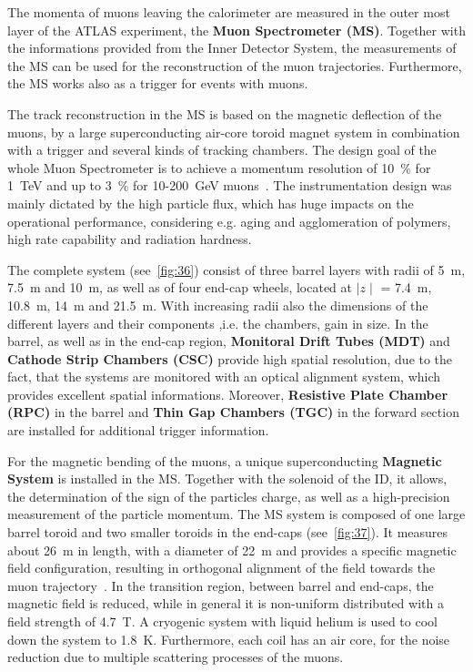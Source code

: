  The momenta of muons leaving the calorimeter are measured in the outer most layer of the ATLAS experiment, the \textbf{Muon Spectrometer (MS)}. Together with the informations provided from the Inner Detector System, the measurements of the MS can be used for the reconstruction of the muon trajectories. Furthermore, the MS works also as a trigger for events with muons.

The track reconstruction in the MS is based on the magnetic deflection of the muons, by a large superconducting air-core toroid magnet system in combination with a trigger and several kinds of tracking chambers. The design goal of the whole Muon Spectrometer is to achieve a momentum resolution of 10~\% for 1~TeV and up to 3~\% for 10-200~GeV muons~\cite{ATLAS:1999uwa}. The instrumentation design was mainly dictated by the high particle flux, which has huge impacts on the operational performance, considering e.g. aging and agglomeration of polymers, high rate capability and radiation hardness.

 The complete system (see~\cref{fig:36}) consist of three barrel layers with radii of  5~m, 7.5~m and 10~m, as well as of four end-cap wheels, located at $\mid z \mid$ = 7.4~m, 10.8~m, 14~m and 21.5~m. 
With increasing radii also the dimensions of the different layers and their components ,i.e. the chambers, gain in size. In the barrel, as well as in the end-cap region, \textbf{Monitoral Drift Tubes (MDT)} and \textbf{Cathode Strip Chambers (CSC)} provide high spatial resolution, due to the fact, that the systems are monitored with an optical alignment system, which provides excellent spatial informations. Moreover, \textbf{Resistive Plate Chamber (RPC)} in the barrel and \textbf{Thin Gap Chambers (TGC)} in the forward section are  installed for additional trigger information.



 For the magnetic bending of the muons, a unique superconducting \textbf{Magnetic System} is installed in the MS. Together with the solenoid of the ID, it allows, the determination of the sign of the particles charge, as well as a high-precision measurement of the particle momentum. The MS system is composed of one large barrel toroid and two smaller toroids in the end-caps (see~\cref{fig:37}). It measures about 26~m in length, with a diameter of 22~m and provides a specific magnetic field configuration, resulting in orthogonal alignment of the field towards the muon trajectory~\cite{ATLAS:1999uwa}. In the transition region, between barrel and end-caps, the magnetic field is reduced, while in general it is  non-uniform distributed  with a field strength of 4.7~T.  A cryogenic system with liquid helium is used to cool down the system to 1.8~K. Furthermore,  each coil has an air core, for the noise reduction due to  multiple scattering processes of the muons. 


